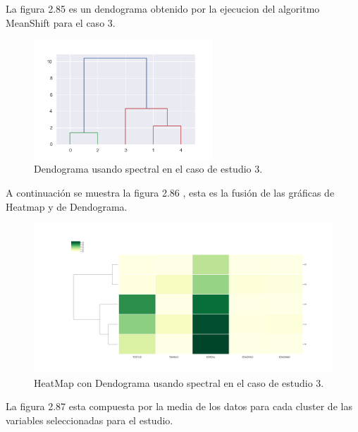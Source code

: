
	La figura 2.85 es un dendograma obtenido por la ejecucion del algoritmo MeanShift para
	el caso 3. \\

	\begin{figure}[htb]
		\centering
		\includegraphics[width=0.6\textwidth]{./imagenes/caso3/dendograma_caso3_spectral}
		\caption{Dendograma usando spectral en el caso de estudio 3.} \label{fig:1}
	\end{figure}

	A continuación se muestra la figura 2.86 , esta es la fusión de las gráficas de 
	Heatmap y de Dendograma.  \\

	\begin{figure}[htb]
		\centering
		\includegraphics[width=1.0\textwidth]{./imagenes/caso3/heatmapcondendograma_caso3_spectral}
		\caption{HeatMap con Dendograma usando spectral en el caso de estudio 3.} \label{fig:1}
	\end{figure}

	La figura 2.87 esta compuesta por la media de los datos para cada cluster de las variables seleccionadas
	para el estudio. \\ 
	
	\clearpage


